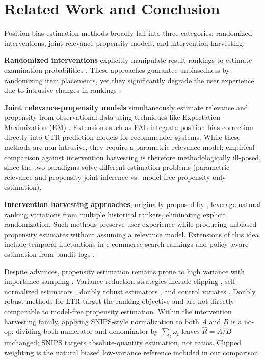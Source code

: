 \documentclass[sigconf]{acmart}
\begin{document}
\section{Related Work and Conclusion}
\label{sec:related_work}

Position bias estimation methods broadly fall into three categories: randomized interventions, joint relevance-propensity models, and intervention harvesting.

\textbf{Randomized interventions} explicitly manipulate result rankings to estimate examination probabilities \cite{joachims2017unbiased, wang2018position}. These approaches guarantee unbiasedness by randomizing item placements, yet they significantly degrade the user experience due to intrusive changes in rankings \cite{joachims2017unbiased}.

\textbf{Joint relevance-propensity models} simultaneously estimate relevance and propensity from observational data using techniques like Expectation-Maximization (EM) \cite{wang2018position}. Extensions such as PAL \cite{pai2020pal} integrate position-bias correction directly into CTR prediction models for recommender systems. While these methods are non-intrusive, they require a parametric relevance model; empirical comparison against intervention harvesting is therefore methodologically ill-posed, since the two paradigms solve different estimation problems (parametric relevance-and-propensity joint inference vs.\ model-free propensity-only estimation).

\textbf{Intervention harvesting approaches}, originally proposed by \cite{agarwal2019estimating}, leverage natural ranking variations from multiple historical rankers, eliminating explicit randomization. Such methods preserve user experience while producing unbiased propensity estimates without assuming a relevance model. Extensions of this idea include temporal fluctuations in e-commerce search rankings \cite{aslanyan2019eCommerceBias} and policy-aware estimation from bandit logs \cite{oosterhuis2023DoublyRobustLTR}.

Despite advances, propensity estimation remains prone to high variance with importance sampling \cite{swaminathan2015CRM}. Variance-reduction strategies include clipping \cite{bottou2013counterfactual}, self-normalized estimators \cite{swaminathan2015batch}, doubly robust estimators \cite{dudik2011doubly, oosterhuis2023DoublyRobustLTR}, and control variates \cite{kong1992note}. Doubly robust methods for LTR \cite{oosterhuis2023DoublyRobustLTR} target the ranking objective and are not directly comparable to model-free propensity estimation. Within the intervention harvesting family, applying SNIPS-style normalization to both $A$ and $B$ is a no-op: dividing both numerator and denominator by $\sum_i \omega_i$ leaves $\hat{R} = A/B$ unchanged; SNIPS targets absolute-quantity estimation, not ratios. Clipped weighting \cite{bottou2013counterfactual} is the natural biased low-variance reference included in our comparison.
\end{document}
